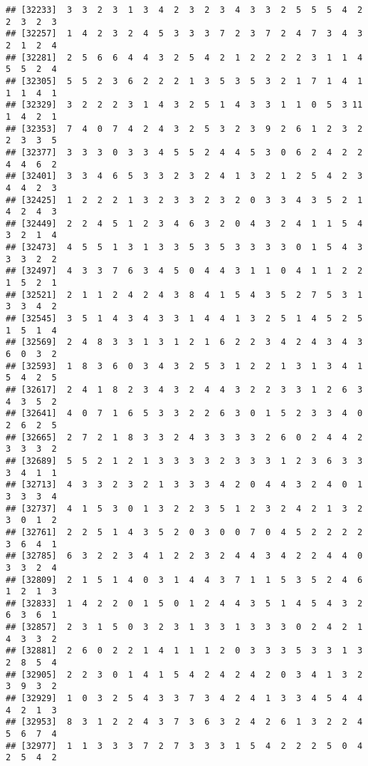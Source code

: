 \documentclass[
]{article}
\begin{document}
\begin{verbatim}
## [32233]  3  3  2  3  1  3  4  2  3  2  3  4  3  3  2  5  5  5  4  2  2  3  2  3
## [32257]  1  4  2  3  2  4  5  3  3  3  7  2  3  7  2  4  7  3  4  3  2  1  2  4
## [32281]  2  5  6  6  4  4  3  2  5  4  2  1  2  2  2  2  3  1  1  4  5  5  2  4
## [32305]  5  5  2  3  6  2  2  2  1  3  5  3  5  3  2  1  7  1  4  1  1  1  4  1
## [32329]  3  2  2  2  3  1  4  3  2  5  1  4  3  3  1  1  0  5  3 11  1  4  2  1
## [32353]  7  4  0  7  4  2  4  3  2  5  3  2  3  9  2  6  1  2  3  2  2  3  3  5
## [32377]  3  3  3  0  3  3  4  5  5  2  4  4  5  3  0  6  2  4  2  2  4  4  6  2
## [32401]  3  3  4  6  5  3  3  2  3  2  4  1  3  2  1  2  5  4  2  3  4  4  2  3
## [32425]  1  2  2  2  1  3  2  3  3  2  3  2  0  3  3  4  3  5  2  1  4  2  4  3
## [32449]  2  2  4  5  1  2  3  4  6  3  2  0  4  3  2  4  1  1  5  4  3  2  1  4
## [32473]  4  5  5  1  3  1  3  3  5  3  5  3  3  3  3  0  1  5  4  3  3  3  2  2
## [32497]  4  3  3  7  6  3  4  5  0  4  4  3  1  1  0  4  1  1  2  2  1  5  2  1
## [32521]  2  1  1  2  4  2  4  3  8  4  1  5  4  3  5  2  7  5  3  1  3  3  4  2
## [32545]  3  5  1  4  3  4  3  3  1  4  4  1  3  2  5  1  4  5  2  5  1  5  1  4
## [32569]  2  4  8  3  3  1  3  1  2  1  6  2  2  3  4  2  4  3  4  3  6  0  3  2
## [32593]  1  8  3  6  0  3  4  3  2  5  3  1  2  2  1  3  1  3  4  1  5  4  2  5
## [32617]  2  4  1  8  2  3  4  3  2  4  4  3  2  2  3  3  1  2  6  3  4  3  5  2
## [32641]  4  0  7  1  6  5  3  3  2  2  6  3  0  1  5  2  3  3  4  0  2  6  2  5
## [32665]  2  7  2  1  8  3  3  2  4  3  3  3  3  2  6  0  2  4  4  2  3  3  3  2
## [32689]  5  5  2  1  2  1  3  3  3  3  2  3  3  3  1  2  3  6  3  3  3  4  1  1
## [32713]  4  3  3  2  3  2  1  3  3  3  4  2  0  4  4  3  2  4  0  1  3  3  3  4
## [32737]  4  1  5  3  0  1  3  2  2  3  5  1  2  3  2  4  2  1  3  2  3  0  1  2
## [32761]  2  2  5  1  4  3  5  2  0  3  0  0  7  0  4  5  2  2  2  2  3  6  4  1
## [32785]  6  3  2  2  3  4  1  2  2  3  2  4  4  3  4  2  2  4  4  0  3  3  2  4
## [32809]  2  1  5  1  4  0  3  1  4  4  3  7  1  1  5  3  5  2  4  6  1  2  1  3
## [32833]  1  4  2  2  0  1  5  0  1  2  4  4  3  5  1  4  5  4  3  2  6  3  6  1
## [32857]  2  3  1  5  0  3  2  3  1  3  3  1  3  3  3  0  2  4  2  1  4  3  3  2
## [32881]  2  6  0  2  2  1  4  1  1  1  2  0  3  3  3  5  3  3  1  3  2  8  5  4
## [32905]  2  2  3  0  1  4  1  5  4  2  4  2  4  2  0  3  4  1  3  2  3  9  3  2
## [32929]  1  0  3  2  5  4  3  3  7  3  4  2  4  1  3  3  4  5  4  4  4  2  1  3
## [32953]  8  3  1  2  2  4  3  7  3  6  3  2  4  2  6  1  3  2  2  4  5  6  7  4
## [32977]  1  1  3  3  3  7  2  7  3  3  3  1  5  4  2  2  2  5  0  4  2  5  4  2

\end{verbatim}
\end{document}
